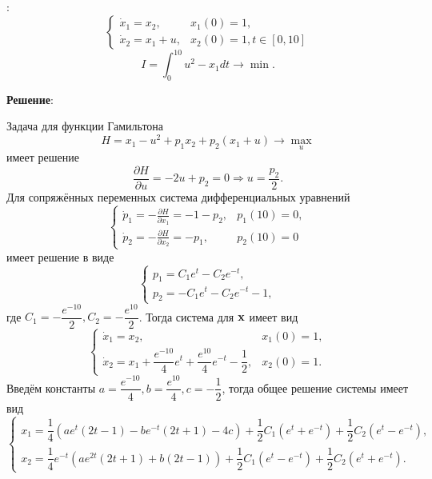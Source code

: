 \documentclass[a4paper, 12pt]{article}
\newcommand{\df}[2]{\frac{\partial #1}{\partial #2}}
\begin{document}
{}:
\begin{equation}
    \begin{cases}
        \dot x_1 =x_2, & x_1(0)=1,\\
        \dot x_2=x_1+u,& x_2(0)=1, t \in [0,10]
    \end{cases}
\end{equation}
\begin{equation}
    I=\int_0^{10} u^2 - x_1 dt \rightarrow \min.
\end{equation}

{\bf Решение}:

Задача для функции Гамильтона
\begin{equation}
    H=x_1-u^2 +p_1 x_2 +p_2 (x_1 +u) \rightarrow \max_u
\end{equation}
имеет решение 
\begin{equation}
    \df{H}{u}=-2u+p_2=0 \Rightarrow u=\dfrac{p_2}{2}.
\end{equation}
Для сопряжённых переменных система дифференциальных уравнений
\begin{equation}
    \begin{cases}
       \dot p_1 = - \df{H}{x_1}=-1-p_2, & p_1(10)=0,\\
       \dot p_2 = - \df{H}{x_2}=-p_1, & p_2(10)=0
    \end{cases}
\end{equation}
имеет решение в виде
\begin{equation}
    \begin{cases}
        p_1= C_1 e^t - C_2 e^{-t},\\
        p_2 = -C_1 e^t - C_2 e^{-t} -1,
    \end{cases}
\end{equation}
где $C_1 = -\dfrac{e^{-10}}{2},C_2 = -\dfrac{e^{10}}{2}$. Тогда система для ${\bf x}$ имеет вид
\begin{equation}
    \begin{cases}
        \dot x_1 =x_2, & x_1(0)=1,\\
        \dot x_2=x_1+\dfrac{e^{-10}}{4}e^t + \dfrac{e^{10}}{4}e^{-t}-\dfrac{1}{2},& x_2(0)=1.
    \end{cases}
\end{equation}
Введём константы $a=\dfrac{e^{-10}}{4},b=\dfrac{e^{10}}{4},c=-\dfrac{1}{2}$, тогда общее решение системы имеет вид
\begin{equation}
    \begin{cases}
        x_1 =\dfrac{1}{4}\left(a e^t (2t-1) - b e^{-t} (2t+1)-4c  \right) +\dfrac{1}{2} C_1 (e^t + e^{-t}) + \dfrac{1}{2} C_2 (e^t - e^{-t}),\\
        x_2=\dfrac{1}{4} e^{-t} \left(a e^{2t} (2t+1) +b (2t-1) \right) +\dfrac{1}{2} C_1 (e^t-e^{-t})+\dfrac{1}{2} C_2 (e^t + e^{-t}).
    \end{cases}
\end{equation}
\end{document}
